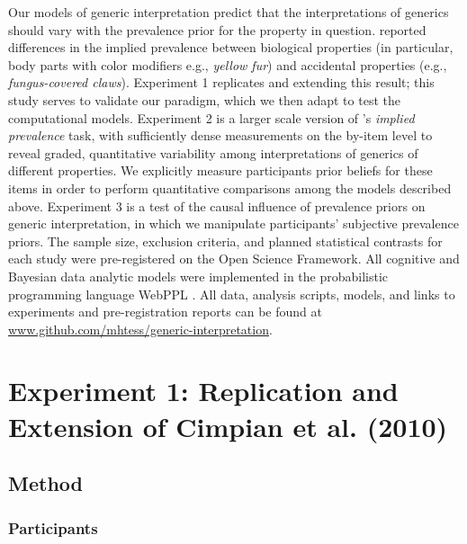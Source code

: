 \documentclass[floatsintext,doc]{apa6}
\begin{document}
Our models of generic interpretation predict that the interpretations of generics should vary with the prevalence prior for the property in question.
 reported differences in the implied prevalence between biological properties (in particular, body parts with color modifiers e.g., \emph{yellow fur}) and accidental properties (e.g., \emph{fungus-covered claws}).
Experiment 1 replicates and extending this result; this study serves to validate our paradigm, which we then adapt to test the computational models.
Experiment 2 is a larger scale version of 's \emph{implied prevalence} task, with sufficiently dense measurements on the by-item level to reveal graded, quantitative variability among interpretations of generics of different properties. 
We explicitly measure participants prior beliefs for these items in order to perform quantitative comparisons among the models described above.
Experiment 3 is a test of the causal influence of prevalence priors on generic interpretation, in which we manipulate participants' subjective prevalence priors.
The sample size, exclusion criteria, and planned statistical contrasts for each study were pre-registered on the Open Science Framework.
All cognitive and Bayesian data analytic models were implemented in the probabilistic programming language WebPPL \cite{dippl}. 
All data, analysis scripts, models, and links to experiments and pre-registration reports can be found at \url{www.github.com/mhtess/generic-interpretation}.

\hypertarget{preliminary-study-replication-and-extension-of-cimpian-et-al.-2010}{%
\section{Experiment 1: Replication and Extension of Cimpian et al. (2010)}\label{preliminary-study-replication-and-extension-of-cimpian-et-al.-2010}}

\subsection{Method}\label{method}

\subsubsection{Participants}

\end{document}
